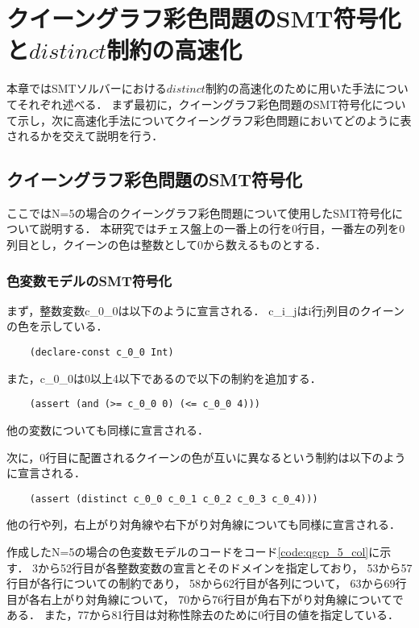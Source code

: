 \chapter{クイーングラフ彩色問題のSMT符号化と$distinct$制約の高速化}

本章ではSMTソルバーにおける$distinct$制約の高速化のために用いた手法についてそれぞれ述べる．
まず最初に，クイーングラフ彩色問題のSMT符号化について示し，次に高速化手法についてクイーングラフ彩色問題においてどのように表されるかを交えて説明を行う．

\section{クイーングラフ彩色問題のSMT符号化}
ここではN=5の場合のクイーングラフ彩色問題について使用したSMT符号化について説明する．
本研究ではチェス盤上の一番上の行を0行目，一番左の列を0列目とし，クイーンの色は整数として0から数えるものとする．


\subsection{色変数モデルのSMT符号化}
まず，整数変数c\_0\_0は以下のように宣言される．
c\_i\_jはi行j列目のクイーンの色を示している．
{ \scriptsize \begin{verbatim}
    (declare-const c_0_0 Int)
\end{verbatim}}
また，c\_0\_0は0以上4以下であるので以下の制約を追加する．
{ \scriptsize \begin{verbatim}
    (assert (and (>= c_0_0 0) (<= c_0_0 4)))
\end{verbatim}}
他の変数についても同様に宣言される．

次に，0行目に配置されるクイーンの色が互いに異なるという制約は以下のように宣言される．
{ \scriptsize \begin{verbatim}
    (assert (distinct c_0_0 c_0_1 c_0_2 c_0_3 c_0_4)))
\end{verbatim}}
他の行や列，右上がり対角線や右下がり対角線についても同様に宣言される．


作成したN=5の場合の色変数モデルのコードをコード\ref{code:qgcp_5_col}に示す．
3から52行目が各整数変数の宣言とそのドメインを指定しており，
53から57行目が各行についての制約であり，
58から62行目が各列について，
63から69行目が各右上がり対角線について，
70から76行目が角右下がり対角線についてである．
また，77から81行目は対称性除去のために0行目の値を指定している．

